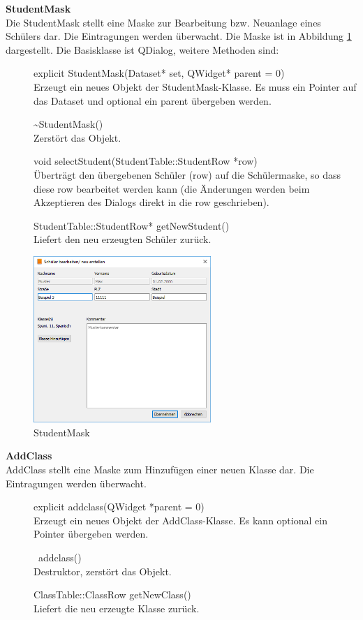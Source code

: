 \textbf{StudentMask}\\
Die StudentMask stellt eine Maske zur Bearbeitung bzw. Neuanlage eines Schülers dar. Die Eintragungen werden überwacht. Die Maske ist in Abbildung \ref{fig:StudentMask} dargestellt. Die Basisklasse ist QDialog, weitere Methoden sind:
\begin{description}
	\item[ ] explicit StudentMask(Dataset* set, QWidget* parent = 0)\\
	Erzeugt ein neues Objekt der StudentMask-Klasse. Es muss ein Pointer auf das Dataset und optional ein parent übergeben werden.
   \item[ ] \~{}StudentMask()\\
	Zerstört das Objekt.
   \item[ ] void selectStudent(StudentTable::StudentRow *row)\\
	 Überträgt den übergebenen Schüler (row) auf die Schülermaske, so dass diese row bearbeitet werden kann (die Änderungen werden beim Akzeptieren des Dialogs direkt in die row geschrieben).
   \item[ ] StudentTable::StudentRow* getNewStudent()\\
	Liefert den neu erzeugten Schüler zurück.
\end{description}
\begin{figure}[htb]
	\centering
		\includegraphics[width=0.60\textwidth]{figures/StudentMask.png}
	\caption{StudentMask}
	\label{fig:StudentMask}
\end{figure}

\textbf{AddClass}\\
AddClass stellt eine Maske zum Hinzufügen einer neuen Klasse dar. Die Eintragungen werden überwacht. 
\begin{description}
	\item[ ] explicit addclass(QWidget *parent = 0)\\
	Erzeugt ein neues Objekt der AddClass-Klasse. Es kann optional ein Pointer übergeben werden.
	\item[ ] ~addclass()\\
	Destruktor, zerstört das Objekt.
	\item[] ClassTable::ClassRow getNewClass()\\
	Liefert die neu erzeugte Klasse zurück.
\end{description}

